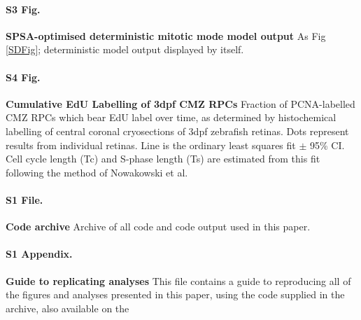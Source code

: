 \documentclass[10pt,letterpaper]{article}
\begin{document}
\paragraph*{S3 Fig.}
\label{deterministicSupplement}
{\bf SPSA-optimised deterministic mitotic mode model output} As Fig \ref{SDFig}; deterministic model output displayed by itself.

\paragraph*{S4 Fig.}
\label{cumulativeSupplement}
{\bf Cumulative EdU Labelling of 3dpf CMZ RPCs} Fraction of PCNA-labelled CMZ RPCs which bear EdU label over time, as determined by histochemical labelling of central coronal cryosections of 3dpf zebrafish retinas. Dots represent results from individual retinas. Line is the ordinary least squares fit $\pm$ 95\% CI. Cell cycle length (Tc) and S-phase length (Ts) are estimated from this fit following the method of Nowakowski et al.\cite{Nowakowski1989}

\paragraph*{S1 File.}
\label{S1_File}
{\bf Code archive} Archive of all code and code output used in this paper.

\paragraph*{S1 Appendix.}
\label{S1_Appendix}
{\bf Guide to replicating analyses} This file contains a guide to reproducing all of the figures and analyses presented in this paper, using the code supplied in the  archive, also available on the 

\nolinenumbers

%
%
% 

\end{document}
